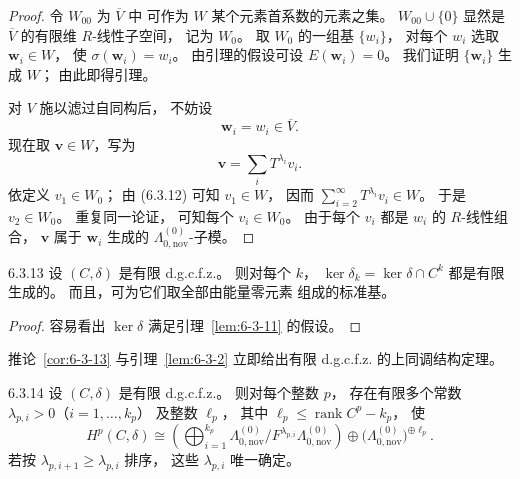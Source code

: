 \begin{proof}
令 $W_{00}$ 为 $\overline V$ 中
可作为 $W$ 某个元素首系数的元素之集。
$W_{00}\cup\{0\}$ 显然是
$\overline V$ 的有限维 $R$-线性子空间，
记为 $W_0$。
取 $W_0$ 的一组基 $\{w_i\}$，
对每个 $w_i$ 选取
$\mathbf w_i\in W$，
使 $\sigma(\mathbf w_i)=w_i$。
由引理的假设可设
$E(\mathbf w_i)=0$。
我们证明 $\{\mathbf w_i\}$ 生成 $W$；
由此即得引理。

对 $V$ 施以滤过自同构后，
不妨设
\begin{equation}
\mathbf w_i=w_i\in\overline V.
\tag{6.3.12}\label{eq:6-3-12}
\end{equation}
现在取 $\mathbf v\in W$，写为
\[
\mathbf v=\sum_iT^{\lambda_i}v_i.
\]
依定义 $v_1\in W_0$；
由 (6.3.12) 可知 $v_1\in W$，
因而
$\sum_{i=2}^{\infty}T^{\lambda_i}v_i\in W$。
于是 $v_2\in W_0$。
重复同一论证，
可知每个 $v_i\in W_0$。
由于每个 $v_i$ 都是 $w_i$ 的
$R$-线性组合，
$\mathbf v$ 属于 $\mathbf w_i$
生成的 $\Lambda_{0,\mathrm{nov}}^{(0)}$-子模。
\end{proof}

\pagebreak
\begin{corollary}{6.3.13}\label{cor:6-3-13}
设 $(C,\delta)$ 是有限 d.g.c.f.z.。
则对每个 $k$，
$\ker\delta_k=\ker\delta\cap C^k$
都是有限生成的。
而且，可为它们取全部由能量零元素
组成的标准基。
\end{corollary}

\begin{proof}
容易看出 $\ker\delta$
满足引理~\ref{lem:6-3-11} 的假设。
\end{proof}

推论~\ref{cor:6-3-13}
与引理~\ref{lem:6-3-2}
立即给出有限 d.g.c.f.z.
的上同调结构定理。

\begin{proposition}{6.3.14}\label{prop:6-3-14}
设 $(C,\delta)$ 是有限 d.g.c.f.z.。
则对每个整数 $p$，
存在有限多个常数
$\lambda_{p,i}>0$（$i=1,\ldots,k_p$）
及整数 $\ell_p$，
其中 $\ell_p\le\operatorname{rank}C^p-k_p$，
使
\begin{equation}
H^p(C,\delta)
\cong
\left(
\bigoplus_{i=1}^{k_p}
\Lambda_{0,\mathrm{nov}}^{(0)}
/F^{\lambda_{p,i}}\Lambda_{0,\mathrm{nov}}^{(0)}
\right)
\oplus
\bigl(\Lambda_{0,\mathrm{nov}}^{(0)}\bigr)^{\oplus\ell_p}.
\tag{6.3.15}\label{eq:6-3-15}
\end{equation}
若按 $\lambda_{p,i+1}\ge\lambda_{p,i}$ 排序，
这些 $\lambda_{p,i}$ 唯一确定。
\end{proposition}

